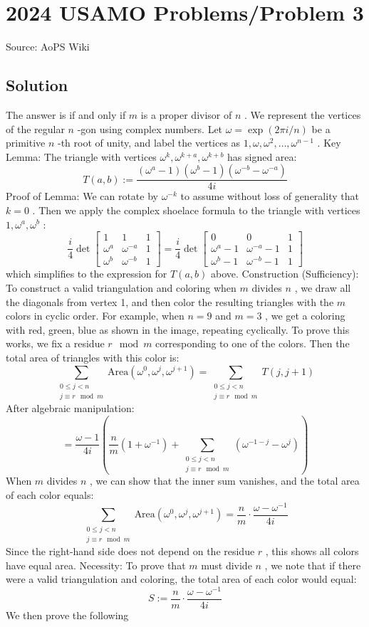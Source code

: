 \documentclass[12pt]{article}
\begin{document}
\section*{{2024 USAMO Problems/Problem 3}}
Source: AoPS Wiki

\subsection*{Solution}
The answer is if and only if $m$ is a proper divisor of $n$ . We represent the vertices of the regular $n$ -gon using complex numbers. Let $\omega = \exp(2\pi i/n)$ be a primitive $n$ -th root of unity, and label the vertices as $1, \omega, \omega^2, \ldots, \omega^{n-1}$ . Key Lemma: The triangle with vertices $\omega^k, \omega^{k+a}, \omega^{k+b}$ has signed area: \[T(a, b) := \frac{(\omega^a - 1)(\omega^b - 1)(\omega^{-b} - \omega^{-a})}{4i}\] Proof of Lemma: We can rotate by $\omega^{-k}$ to assume without loss of generality that $k = 0$ . Then we apply the complex shoelace formula to the triangle with vertices $1, \omega^a, \omega^b$ : \[\frac{i}{4} \det \begin{bmatrix} 1 & 1 & 1 \\ \omega^a & \omega^{-a} & 1 \\ \omega^b & \omega^{-b} & 1 \end{bmatrix} = \frac{i}{4} \det \begin{bmatrix} 0 & 0 & 1 \\ \omega^a - 1 & \omega^{-a} - 1 & 1 \\ \omega^b - 1 & \omega^{-b} - 1 & 1 \end{bmatrix}\] which simplifies to the expression for $T(a, b)$ above. Construction (Sufficiency): To construct a valid triangulation and coloring when $m$ divides $n$ , we draw all the diagonals from vertex 1, and then color the resulting triangles with the $m$ colors in cyclic order. For example, when $n = 9$ and $m = 3$ , we get a coloring with red, green, blue as shown in the image, repeating cyclically. To prove this works, we fix a residue $r \mod m$ corresponding to one of the colors. Then the total area of triangles with this color is: \[\sum_{\substack{0 \leq j < n \\ j \equiv r \mod m}} \text{Area}(\omega^0, \omega^j, \omega^{j+1}) = \sum_{\substack{0 \leq j < n \\ j \equiv r \mod m}} T(j, j+1)\] After algebraic manipulation: \[= \frac{\omega - 1}{4i} \left(\frac{n}{m}(1 + \omega^{-1}) + \sum_{\substack{0 \leq j < n \\ j \equiv r \mod m}} (\omega^{-1-j} - \omega^j)\right)\] When $m$ divides $n$ , we can show that the inner sum vanishes, and the total area of each color equals: \[\sum_{\substack{0 \leq j < n \\ j \equiv r \mod m}} \text{Area}(\omega^0, \omega^j, \omega^{j+1}) = \frac{n}{m} \cdot \frac{\omega - \omega^{-1}}{4i}\] Since the right-hand side does not depend on the residue $r$ , this shows all colors have equal area. Necessity: To prove that $m$ must divide $n$ , we note that if there were a valid triangulation and coloring, the total area of each color would equal: \[S := \frac{n}{m} \cdot \frac{\omega - \omega^{-1}}{4i}\] We then prove the following 
\end{document}
